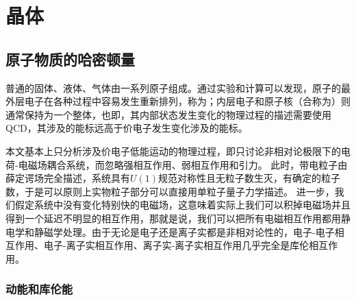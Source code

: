 \chapter{晶体}\label{chap:components}

\section{原子物质的哈密顿量}

普通的固体、液体、气体由一系列原子组成。通过实验和计算可以发现，原子的最外层电子在各种过程中容易发生重新排列，称为；内层电子和原子核（合称为）则通常保持为一个整体，也即，其内部状态发生变化的物理过程的描述需要使用QCD，其涉及的能标远高于价电子发生变化涉及的能标。

本文基本上只分析涉及价电子低能运动的物理过程，即只讨论非相对论极限下的电荷-电磁场耦合系统，而忽略强相互作用、弱相互作用和引力。
此时，带电粒子由薛定谔场完全描述，系统具有$U(1)$规范对称性且无粒子数生灭，有确定的粒子数，于是可以原则上实物粒子部分可以直接用单粒子量子力学描述。
进一步，我们假定系统中没有变化特别快的电磁场，这意味着实际上我们可以积掉电磁场并且得到一个延迟不明显的相互作用，那就是说，我们可以把所有电磁相互作用都用静电学和静磁学处理。由于无论是电子还是离子实都是非相对论性的，电子-电子相互作用、电子-离子实相互作用、离子实-离子实相互作用几乎完全是库伦相互作用。

\subsection{动能和库伦能}


